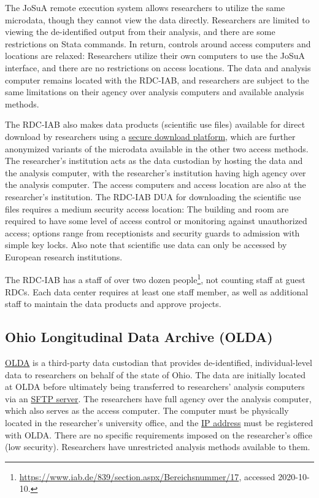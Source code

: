 The JoSuA remote execution system allows researchers to utilize the same microdata, though they cannot view the data directly. Researchers are limited to viewing the de-identified output from their analysis, and there are some restrictions on Stata commands. In return, controls around access computers and locations are relaxed: Researchers utilize their own computers to use the JoSuA interface, and there are no restrictions on access locations. The data and analysis computer remains located with the RDC-IAB, and researchers are subject to the same limitations on their agency over analysis computers and available analysis methods.

The RDC-IAB also makes data products (scientific use files) available for direct download by researchers using a \protect\hyperlink{secure-network-protocols}{secure download platform}, which are further anonymized variants of the microdata available in the other two access methods. The researcher's institution acts as the data custodian by hosting the data and the analysis computer, with the researcher's institution having high agency over the analysis computer. The access computers and access location are also at the researcher's institution. The RDC-IAB DUA for downloading the scientific use files requires a medium security access location: The building and room are required to have some level of access control or monitoring against unauthorized access; options range from receptionists and security guards to admission with simple key locks. Also note that scientific use data can only be accessed by European research institutions.

The RDC-IAB has a staff of over two dozen people\footnote{\url{https://www.iab.de/839/section.aspx/Bereichsnummer/17}, accessed 2020-10-10.}, not counting staff at guest RDCs. Each data center requires at least one staff member, as well as additional staff to maintain the data products and approve projects.

\hypertarget{ohio-longitudinal-data-archive-olda}{%
\subsection{Ohio Longitudinal Data Archive (OLDA)}\label{ohio-longitudinal-data-archive-olda}}

\protect\hyperlink{olda}{OLDA} is a third-party data custodian that provides de-identified, individual-level data to researchers on behalf of the state of Ohio. The data are initially located at OLDA before ultimately being transferred to researchers' analysis computers via an \protect\hyperlink{secure-network-protocols}{SFTP server}. The researchers have full agency over the analysis computer, which also serves as the access computer. The computer must be physically located in the researcher's university office, and the \protect\hyperlink{ip-address-restrictions}{IP address} must be registered with OLDA. There are no specific requirements imposed on the researcher's office (low security). Researchers have unrestricted analysis methods available to them.

